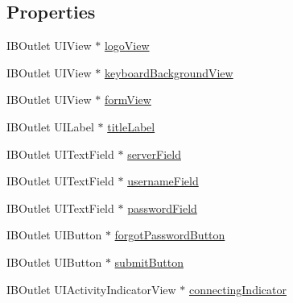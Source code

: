 \subsection*{Properties}
\begin{DoxyCompactItemize}
\item 
I\-B\-Outlet U\-I\-View $\ast$ \hyperlink{interface_w_user_login_view_controller_a961faf479afdeddb079b3f8b98b0e13c}{logo\-View}
\item 
I\-B\-Outlet U\-I\-View $\ast$ \hyperlink{interface_w_user_login_view_controller_af4d40a11d01ec6d81d38015525088ad7}{keyboard\-Background\-View}
\item 
I\-B\-Outlet U\-I\-View $\ast$ \hyperlink{interface_w_user_login_view_controller_a393fa5449b54a6b540131b5a3a7d3d3b}{form\-View}
\item 
I\-B\-Outlet U\-I\-Label $\ast$ \hyperlink{interface_w_user_login_view_controller_ae075cae889f9b93f4e2d4d34404c7a42}{title\-Label}
\item 
I\-B\-Outlet U\-I\-Text\-Field $\ast$ \hyperlink{interface_w_user_login_view_controller_aca8ba63852063a326a36180d4489c5de}{server\-Field}
\item 
I\-B\-Outlet U\-I\-Text\-Field $\ast$ \hyperlink{interface_w_user_login_view_controller_a5131df666139de3fe9e992cc0e7270d8}{username\-Field}
\item 
I\-B\-Outlet U\-I\-Text\-Field $\ast$ \hyperlink{interface_w_user_login_view_controller_a8427bd8d7bde24e7e3276896048515fb}{password\-Field}
\item 
I\-B\-Outlet U\-I\-Button $\ast$ \hyperlink{interface_w_user_login_view_controller_a85f3d3ba54054bf6d2c000aa92ffd227}{forgot\-Password\-Button}
\item 
I\-B\-Outlet U\-I\-Button $\ast$ \hyperlink{interface_w_user_login_view_controller_a2a7c3d4b33a80b0297668180f3a70716}{submit\-Button}
\item 
I\-B\-Outlet U\-I\-Activity\-Indicator\-View $\ast$ \hyperlink{interface_w_user_login_view_controller_ad846691cb085b4c5f9db81d22936d598}{connecting\-Indicator}
\end{DoxyCompactItemize}


